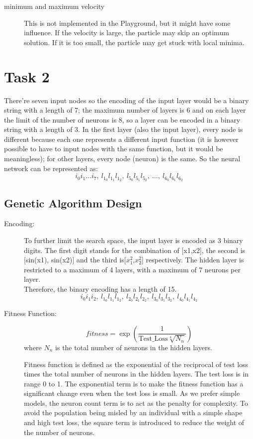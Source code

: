 \documentclass[12pt]{article}
\begin{document}
\begin{description}
\item[minimum and maximum velocity]
This is not implemented in the Playground, but it might have some influence. If the velocity is large, the particle may skip an optimum solution. If it is too small, the particle may get stuck with local minima.
\end{description}

\section{Task 2}
There're seven input nodes so the encoding of the input layer would be a binary string with a length of 7; the maximum number of layers is 6 and on each layer the limit of the number of neurons is 8, so a layer can be encoded in a binary string with a length of 3. In the first layer (also the input layer), every node is different because each one represents a different input function (it is however possible to have to input nodes with the same function, but it would be meaningless); for other layers, every node (neuron) is the same. So the neural network can be represented as:
$$
{i_0i_1\ldots i_7,\ l_{1_0}l_{1_1}l_{1_2},\ l_{5_0}l_{5_1}l_{5_2},\ \ldots,\ l_{6_0}l_{6_1}l_{6_2}}
$$

\subsection{Genetic Algorithm Design}
\begin{description}
\item[Encoding: ]

To further limit the search space, the input layer is encoded as 3 binary digits. The first digit stands for the combination of [x1,x2], the second is [sin(x1), sin(x2)] and the third is[$x_1^2$,$x_2^2$] respectively. The hidden layer is restricted to a maximum of 4 layers, with a maximum of 7 neurons per layer.\\
Therefore, the binary encoding has a length of 15. 
\[
{i_0i_1i_2,\ l_{1_0}l_{1_1}l_{1_2},\ l_{2_0}l_{2_1}l_{2_2},\ l_{3_0}l_{3_1}l_{3_2},\ l_{4_0}l_{4_1}l_{4_2}}
\]
\end{description}

\begin{description}
\item[Fitness Function: ]
\[
fitness = \exp(\frac1{\text{Test\_Loss} \sqrt[4]{N_n}})
\]
where $N_n$ is the total number of neurons in the hidden layers.

Fitness function is defined as the exponential of the reciprocal of test loss times the total number of neurons in the hidden layers. The test loss is in range 0 to 1. The exponential term is to make the fitness function has a significant change even when the test loss is small. As we prefer simple models, the neuron count term is to act as the penalty for complexity. To avoid the population being misled by an individual with a simple shape and high test loss, the square term is introduced to reduce the weight of the number of neurons.

\end{description}
\end{document}
